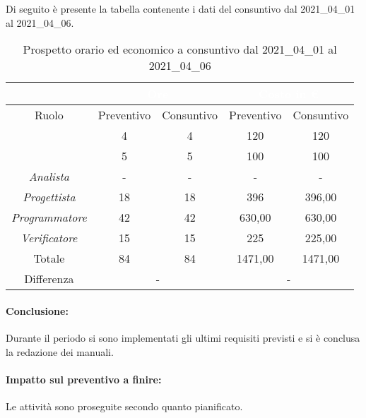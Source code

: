 Di seguito è presente la tabella contenente i dati del consuntivo dal 2021\_04\_01 al 2021\_04\_06.
\begin{table}[H]
	\centering
	\begin{tabular}{|c|c|c|c|c|}
		\rowcolor{darkblue} 
		&\multicolumn{2}{c|}{\textcolor{white}{Ore}}&\multicolumn{2}{c|}{\textcolor{white}{Costo in €}}\\ \hline
		Ruolo				&	Preventivo			&	Consuntivo		&	Preventivo	&	Consuntivo\\ \hline
		{\Responsabile}		&	4					&	4				&	120			&	120 \\ \hline
		{\Amministratore}	&	5					&	5				&	100			&	100 \\ \hline
		\textit{Analista}	&	-					&	-				&	-			&	- \\ \hline
		\textit{Progettista}& 	18					&   18 				& 	396			&  	396,00 \\ \hline
		\textit{Programmatore}& 42					& 	42				& 	630,00		&  	630,00 \\ \hline
		\textit{Verificatore}&	15					&	15				&	225			&	225,00 \\ \hline
		Totale				&	84					&	84				&	1471,00		&	1471,00 \\ \hline
		Differenza			& 	\multicolumn{2}{c|}{-} 					&\multicolumn{2}{c|}{-}\\ \hline
	\end{tabular}
	\caption{Prospetto orario ed economico a consuntivo dal 2021\_04\_01 al 2021\_04\_06}
\end{table}
\paragraph*{Conclusione:}
Durante il periodo si sono implementati gli ultimi requisiti previsti e si è conclusa la redazione dei manuali.
\paragraph*{Impatto sul preventivo a finire:}
Le attività sono proseguite secondo quanto pianificato.